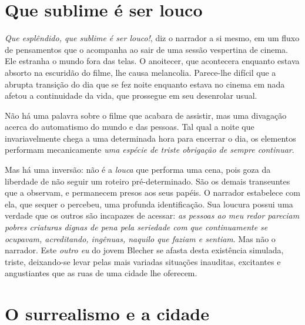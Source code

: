 \section{Que sublime é ser louco}

\textit{Que esplêndido, que sublime é ser louco!}, diz o narrador a si mesmo, em um fluxo de pensamentos que o acompanha ao sair de uma sessão vespertina de cinema. Ele estranha o mundo fora das telas. O anoitecer, que acontecera enquanto estava absorto na escuridão do filme, lhe causa melancolia. Parece-lhe difícil que a abrupta transição do dia que se fez noite enquanto estava no cinema em nada afetou a continuidade da vida, que prossegue em seu desenrolar usual.

Não há uma palavra sobre o filme que acabara de assistir, mas uma divagação acerca do automatismo do mundo e das pessoas. Tal qual a noite que invariavelmente chega a uma determinada hora para encerrar o dia, os elementos performam mecanicamente \textit{uma espécie de triste obrigação de sempre continuar}.


Mas há uma inversão: não é a \textit{louca} que performa uma cena, pois goza da liberdade de não seguir um roteiro pré-determinado. São os demais transeuntes que a observam, e permanecem presos aos seus papéis. O narrador estabelece com ela, que sequer o percebeu, uma profunda identificação. Sua loucura possui uma verdade que os outros são incapazes de acessar: \textit{as pessoas ao meu redor pareciam pobres criaturas dignas de pena pela seriedade com que continuamente se ocupavam, acreditando, ingênuas, naquilo que faziam e sentiam}. Mas não o narrador. Este \textit{outro eu} do jovem Blecher se afasta desta existência simulada, triste, deixando-se levar pelas mais variadas situações inauditas, excitantes e angustiantes que as ruas de uma cidade lhe oferecem. 

\section{O surrealismo e a cidade}


